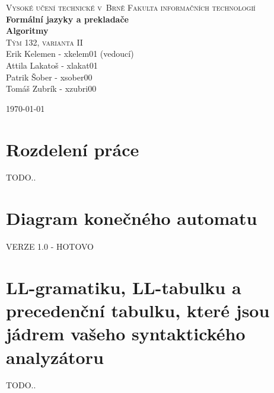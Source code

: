 \documentclass[a4paper, 11 pt]{article}
\begin{document}
\begin{titlepage}
\begin{center}
\textsc{\Huge Vysoké učení technické v~Brně
Fakulta informačních technologií} \\
\Huge \textbf{Formální jazyky a prekladače \\ Algoritmy} \\
\textsc{\Huge Tým 132, varianta II} \\
\LARGE \textmd{Erik Kelemen - xkelem01 (vedoucí)\\
	Attila Lakatoš - xlakat01 \\
	Patrik Šober - xsober00 \\
	Tomáš Zubrík - xzubri00} \\
\end{center}
{\LARGE \today}
\end{titlepage}

\section{\textbf{Rozdelení práce}}
TODO..

\section{\textbf{Diagram konečného automatu}}
VERZE 1.0 - HOTOVO 

\section{\textbf{LL-gramatiku, LL-tabulku a precedenční tabulku, které jsou jádrem vašeho syntaktického analyzátoru}}
TODO..

\newpage
\end{document}
